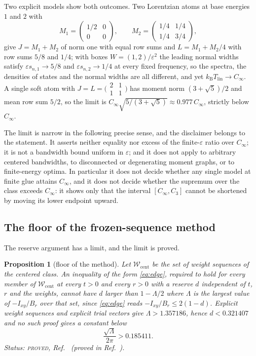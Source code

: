 \documentclass[aps,10pt,superscriptaddress,floatfix,amsmath,amssymb,nofootinbib]{revtex4-2}
\newcommand{\kb}{k_{\mathrm B}}
\newcommand{\Tlin}{T_{\mathrm{lin}}}
\newcommand{\Cinf}{C_\infty}
\newcommand{\Cthree}{C_{3}}
\newcommand{\PROVED}{\textsc{proved}}
\newtheorem{proposition}{Proposition}
\begin{document}
Two explicit models show both outcomes. Two Lorentzian atoms at base energies $1$ and $2$
with
\begin{equation}\label{eq:atoms}
M_1=\begin{pmatrix}1/2&0\\0&0\end{pmatrix},\qquad
M_2=\begin{pmatrix}1/4&1/4\\1/4&3/4\end{pmatrix},
\end{equation}
give $J=M_1+M_2$ of norm one with equal row sums and $L=M_1+M_2/4$ with row sums $5/8$ and
$1/4$; with boxes $W=(1,2)/\varepsilon^{2}$ the leading normal widths satisfy
$\varepsilon s_{n,1}\to5/8$ and $\varepsilon s_{n,2}\to1/4$ at every fixed frequency, so the
spectra, the densities of states and the normal widths are all different, and yet
$\kb\Tlin\to\Cinf$. A single soft atom with $J=L=\bigl(\begin{smallmatrix}2&1\\1&1\end{smallmatrix}\bigr)$
has moment norm $(3+\sqrt5)/2$ and mean row sum $5/2$, so the limit is
$\Cinf\sqrt{5/(3+\sqrt5)}\approx0.977\,\Cinf$, strictly below $\Cinf$.

The limit is narrow in the following precise sense, and the disclaimer belongs to the
statement. It asserts neither equality nor excess of the finite-$\varepsilon$ ratio over
$\Cinf$; it is not a bandwidth bound uniform in $\varepsilon$; and it does not apply to
arbitrary centered bandwidths, to disconnected or degenerating moment graphs, or to
finite-energy optima. In particular it does not decide whether any single model at finite
glue attains $\Cinf$, and it does not decide whether the supremum over the class exceeds
$\Cinf$: it shows only that the interval $[\Cinf,\Cthree]$ cannot be shortened by moving its
lower endpoint upward.

\subsection{The floor of the frozen-sequence method}

The reserve argument has a limit, and the limit is proved.

\begin{proposition}[floor of the method]\label{prop:floor}
Let $\mathcal W_{\mathrm{cent}}$ be the set of weight sequences of the centered class. An
inequality of the form \eqref{eq:edge}, required to hold for every member of
$\mathcal W_{\mathrm{cent}}$ at every $t>0$ and every $r>0$ with a reserve $d$ independent
of $t$, $r$ and the weights, cannot have $d$ larger than $1-\Lambda/2$ where $\Lambda$ is
the largest value of $-I_{xy}/B_r$ over that set, since \eqref{eq:edge} reads
$-I_{xy}/B_r\le2(1-d)$. Explicit weight sequences and explicit trial vectors give
$\Lambda>1.357186$, hence $d<0.321407$ and no such proof gives a constant below
\begin{equation}\label{eq:floor}
\frac{\sqrt{\Lambda}}{2\pi}>0.185411 .
\end{equation}
Status: \PROVED{}, Ref.~\cite{anisosharp} (proved in Ref.~\cite{finiteenergy}).
\end{proposition}
\end{document}
